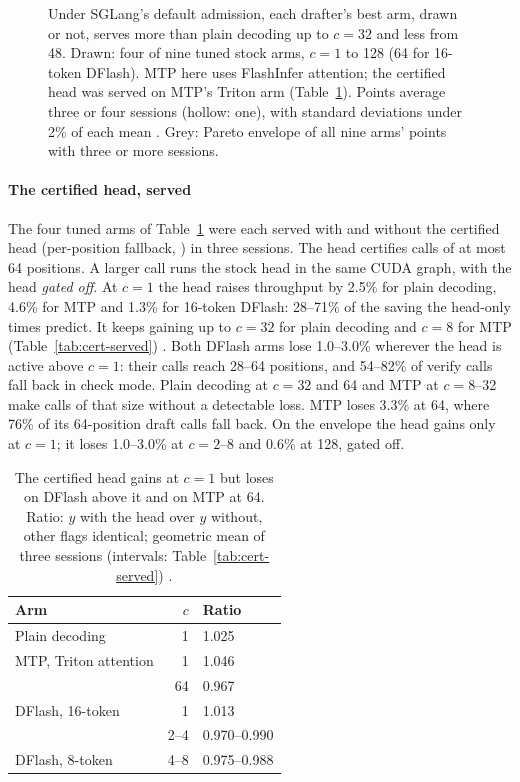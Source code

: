 \begin{figure}[t]
\centering
%
\caption{Under SGLang's default admission, each drafter's best arm, drawn or not, serves more than plain decoding up to $c=32$ and less from 48. Drawn: four of nine tuned stock arms, $c=1$ to 128 (64 for 16-token DFlash). MTP here uses FlashInfer attention; the certified head was served on MTP's Triton arm (Table~\ref{tab:head-served}). Points average three or four sessions (hollow: one), with standard deviations under 2\% of each mean . Grey: Pareto envelope of all nine arms' points with three or more sessions.}
\label{fig:frontier}
\end{figure}

\paragraph{The certified head, served} The four tuned arms of Table~\ref{tab:head-served} were each served with and without the certified head (per-position fallback, \modelcons{}) in three sessions. The head certifies calls of at most 64 positions. A larger call runs the stock head in the same CUDA graph, with the head \emph{gated off}. At $c=1$ the head raises throughput by 2.5\% for plain decoding, 4.6\% for MTP and 1.3\% for 16-token DFlash: 28--71\% of the saving the head-only times predict. It keeps gaining up to $c=32$ for plain decoding and $c=8$ for MTP (Table~\ref{tab:cert-served}) . Both DFlash arms lose 1.0--3.0\% wherever the head is active above $c=1$: their calls reach 28--64 positions, and 54--82\% of verify calls fall back in check mode. Plain decoding at $c=32$ and 64 and MTP at $c=8$--32 make calls of that size without a detectable loss. MTP loses 3.3\% at 64, where 76\% of its 64-position draft calls fall back. On the envelope the head gains only at $c=1$; it loses 1.0--3.0\% at $c=2$--8 and 0.6\% at 128, gated off.

\begin{table}[t]
\caption{The certified head gains at $c=1$ but loses on DFlash above it and on MTP at 64. Ratio: $y$ with the head over $y$ without, other flags identical; geometric mean of three sessions (intervals: Table~\ref{tab:cert-served}) .}\label{tab:head-served}
\vskip 0.05in
\centering\tablefont\setlength{\tabcolsep}{3.5pt}
\begin{tabular}{@{}lrl@{}}
\toprule
Arm & $c$ & Ratio\\\midrule
Plain decoding & 1 & 1.025\\
MTP, Triton attention & 1 & 1.046\\
& 64 & 0.967\\
DFlash, 16-token & 1 & 1.013\\
& 2--4 & 0.970--0.990\\
DFlash, 8-token & 4--8 & 0.975--0.988\\
\bottomrule
\end{tabular}
\end{table}


